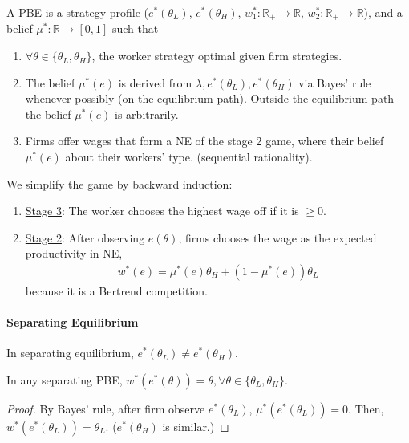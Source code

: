 \documentclass[11pt]{elegantbook}
\begin{document}
\begin{definition}
    \normalfont
    A PBE is a strategy profile ($e^*(\theta_L)$, $e^*(\theta_H)$, $w^*_1: \mathbb{R}_+ \rightarrow \mathbb{R}$, $w^*_2: \mathbb{R}_+ \rightarrow \mathbb{R}$), and a belief $\mu^*: \mathbb{R} \rightarrow [0,1]$ such that
    \begin{enumerate}
        \item $\forall \theta\in\{\theta_L,\theta_H\}$, the worker strategy optimal given firm strategies.
        \item The belief $\mu^*(e)$ is derived from $\lambda, e^*(\theta_L), e^*(\theta_H)$ via Bayes' rule whenever possibly (on the equilibrium path). Outside the equilibrium path the belief $\mu^*(e)$ is arbitrarily.
        \item Firms offer wages that form a NE of the stage 2 game, where their belief $\mu^*(e)$ about their workers' type. (sequential rationality).
    \end{enumerate}
\end{definition}
We simplify the game by backward induction:
\begin{enumerate}
    \item \underline{Stage 3}: The worker chooses the highest wage off if it is $\geq 0$.
    \item \underline{Stage 2}: After observing $e(\theta)$, firms chooses the wage as the expected productivity in NE,
    \begin{equation}
        \begin{aligned}
            w^*(e)=\mu^*(e)\theta_H+(1-\mu^*(e))\theta_L
        \end{aligned}
        \nonumber
    \end{equation}
    because it is a Bertrend competition.
\end{enumerate}
\paragraph*{Separating Equilibrium}
In separating equilibrium, $e^*(\theta_L)\neq e^*(\theta_H)$.
\begin{lemma}
    In any separating PBE, $w^*(e^*(\theta))=\theta, \forall \theta\in\{\theta_L,\theta_H\}$.
\end{lemma}
\begin{proof}
    By Bayes' rule, after firm observe $e^*(\theta_L)$, $\mu^*(e^*(\theta_L))=0$. Then, $w^*(e^*(\theta_L))=\theta_L$. ($e^*(\theta_H)$ is similar.)
\end{proof}
\end{document}
